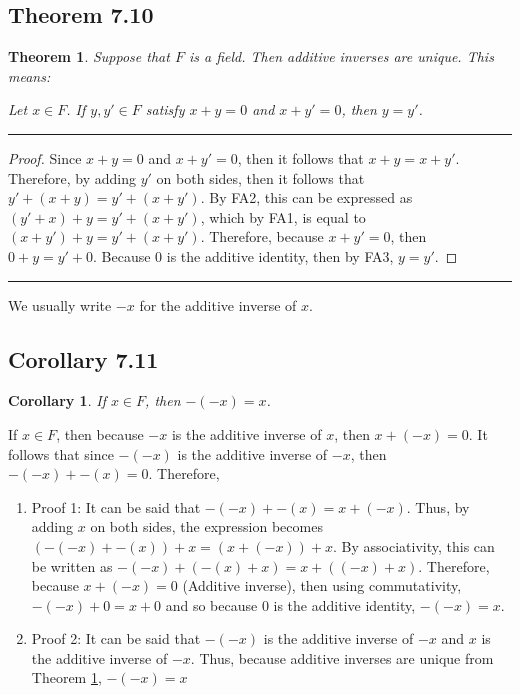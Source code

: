 \documentclass[openany, amssymb, psamsfonts]{amsart}
\newtheorem{thm}{Theorem}[section]
\newtheorem{cor}{Corollary}[section]
\theoremstyle{definition}
\numberwithin{equation}{section}
\begin{document}
\subsection*{Theorem 7.10}
\begin{thm}
\label{7.10}
	Suppose that $F$ is a field.  Then additive inverses are unique.  This means:

 Let $x \in F$.  If $y, y' \in F$ satisfy $x + y = 0$ and $x + y' = 0$, then $y = y'$.
\end{thm}
\vspace{4pt}     \hrule   \vspace{4pt}
\begin{proof}
Since $x+y=0$ and $x+y'=0$, then it follows that $x+y = x+y'$. Therefore, by adding $y'$ on both sides, then it follows that $y'+(x+y) = y'+(x+y')$. By FA2, this can be expressed as $(y'+x) +y = y' + (x+y')$, which by FA1, is equal to $(x+y') +y = y' + (x+y')$. Therefore, because $x+y' = 0$, then $0+y = y' +0$. Because $0$ is the additive identity, then by FA3, $y=y'$.
\end{proof}		
\vspace{4pt}     \hrule   \vspace{4pt}
We usually write $-x$ for the additive inverse of $x$.
\subsection*{Corollary 7.11}
\begin{cor}
\label{7.11}
    If $x\in F$, then $-(-x)=x$.
\end{cor}
If $x\in F$, then because $-x$ is the additive inverse of $x$, then $x+(-x) =0$. It follows that since $-(-x)$ is the additive inverse of $-x$, then $-(-x) +-(x) = 0$. Therefore,
\begin{enumerate}
    \item Proof 1: It can be said that $-(-x) +-(x) =x+(-x)$. Thus, by adding $x$ on both sides, the expression becomes $(-(-x) +-(x)) +x =(x+(-x))+x$. By associativity, this can be written as $-(-x) +(-(x) +x) =x+((-x)+x)$. Therefore, because $x+(-x) = 0$ (Additive inverse), then using commutativity, $-(-x) +0 = x+0$ and so because $0$ is the additive identity, $-(-x) =x$.
    \item Proof 2: It can be said that $-(-x)$ is the additive inverse of $-x$ and $x$ is the additive inverse of $-x$. Thus, because additive inverses are unique from Theorem \ref{7.10}, $-(-x) = x$
\end{enumerate}
\end{document}
